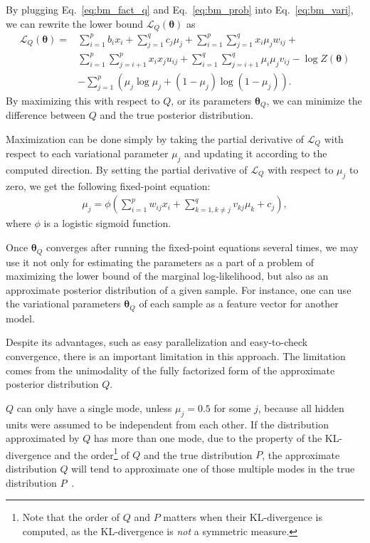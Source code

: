 \documentclass{now}
\newcommand{\vects}[1]{\boldsymbol{#1}}
\newcommand{\TT}[0]{{\vects{\theta}}}
\newcommand{\LL}[0]{\mathcal{L}}
\begin{document}
By plugging Eq.~\eqref{eq:bm_fact_q} and Eq.~\eqref{eq:bm_prob} into
Eq.~\eqref{eq:bm_vari}, we can rewrite the lower bound $\LL_Q(\TT)$ as
\begin{align}
    \label{eq:bm_lowerbound}
    \LL_Q(\TT) =& \sum_{i=1}^p b_i x_i + \sum_{j=1}^q c_j
    \mu_j + \sum_{i=1}^p \sum_{j=1}^q x_i \mu_j w_{ij} + 
    \nonumber \\ 
    & \sum_{i=1}^p \sum_{j=i+1}^p x_i x_j u_{ij} +
    \sum_{i=1}^q \sum_{j=i+1}^q \mu_i \mu_j v_{ij} -\log
    Z(\TT) 
    \nonumber \\
    & - \sum_{j=1}^p \left( \mu_j \log \mu_j + (1
    - \mu_j) \log (1 - \mu_j)
    \right).
\end{align}
By maximizing this with respect to $Q$, or its parameters $\TT_Q$, we can
minimize the difference between $Q$ and the true posterior distribution. 

Maximization can be done simply by taking the partial derivative of $\LL_Q$ with
respect to each variational parameter $\mu_j$ and updating it according to the
computed direction. By setting the partial derivative of $\LL_Q$ with respect to
$\mu_j$ to zero, we get the following fixed-point equation:
\begin{align}
    \label{eq:vari_update}
    \mu_j = \phi\left(\sum_{i=1}^p w_{ij} x_i +
    \sum_{k=1, k\neq j}^q v_{kj} \mu_k + c_j\right),
\end{align}
where $\phi$ is a logistic sigmoid function.

Once $\TT_Q$ converges after running the fixed-point equations several times, we
may use it not only for estimating the parameters as a part of a problem of
maximizing the lower bound of the marginal log-likelihood, but also as an
approximate posterior distribution of a given sample. For instance, one can use
the variational parameters $\TT_Q$ of each sample as a feature vector for
another model.

Despite its advantages, such as easy parallelization and easy-to-check
convergence, there is an important limitation in this approach. The limitation
comes from the unimodality of the fully factorized form of the approximate
posterior distribution $Q$.

$Q$ can only have a single mode, unless $\mu_j=0.5$ for some $j$, because all
hidden units were assumed to be independent from each other. If the distribution
approximated by $Q$ has more than one mode, due to the property of the
KL-divergence and the order\footnote{
    Note that the order of $Q$ and $P$ matters when their KL-divergence is
    computed, as the KL-divergence is \textit{not} a symmetric measure.
} of $Q$ and the true distribution $P$, the approximate distribution $Q$ will
tend to approximate one of those multiple modes in the true distribution
$P$~\citep[see][Section 21.2.2 for more details]{Murphy2012}.
\end{document}
